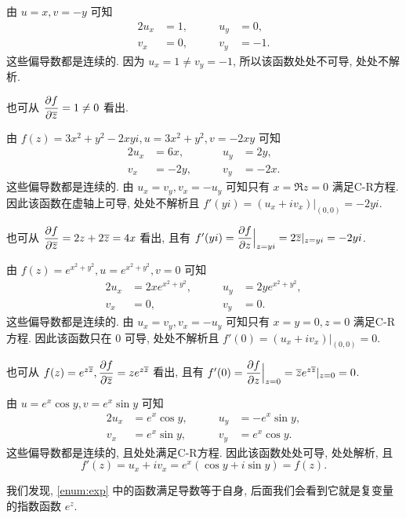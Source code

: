 \begin{solution}\delspace
  \begin{enumnopar}[(i)]
    \item 由 $u=x,v=-y$ 可知
      \begin{alignat*}{2}
        u_x&=1,\qquad&u_y&=0,\\
        v_x&=0,\qquad&v_y&=-1.
      \end{alignat*}
      这些偏导数都是连续的.
      因为 $u_x=1\neq v_y=-1$, 所以该函数处处不可导, 处处不解析.

      也可从 $\dfrac{\partial f}{\partial \overline z}=1\neq0$ 看出.
    \item 由 $f(z)=3x^2+y^2-2xyi,u=3x^2+y^2,v=-2xy$ 可知
      \begin{alignat*}{2}
        u_x&=6x,\qquad&u_y&=2y,\\
        v_x&=-2y, \qquad&v_y&=-2x.
      \end{alignat*}
      这些偏导数都是连续的.
      由 $u_x=v_y,v_x=-u_y$ 可知只有 $x=\Re z=0$ 满足C-R方程.
      因此该函数在虚轴上可导, 处处不解析且 $f'(yi)=(u_x+iv_x)|_{(0,0)}=-2yi$.

      也可从 $\dfrac{\partial f}{\partial \overline z}=2z+2\overline z=4x$ 看出, 且有 $f'(yi)=\dfrac{\partial f}{\partial z}\Big|_{z=yi}=2\overline z|_{z=yi}=-2yi$.
    \item 由 $f(z)=e^{x^2+y^2},u=e^{x^2+y^2},v=0$ 可知
      \begin{alignat*}{2}
        u_x&=2xe^{x^2+y^2},\qquad&u_y&=2ye^{x^2+y^2},\\
        v_x&=0, \qquad&v_y&=0.
      \end{alignat*}
      这些偏导数都是连续的.
      由 $u_x=v_y,v_x=-u_y$ 可知只有 $x=y=0,z=0$ 满足C-R方程.
      因此该函数只在 $0$ 可导, 处处不解析且 $f'(0)=(u_x+iv_x)|_{(0,0)}=0$.

      也可从 $f(z)=e^{z\overline z}, \dfrac{\partial f}{\partial \overline z}=ze^{z\overline z}$ 看出, 且有 $f'(0)=\dfrac{\partial f}{\partial z}\Big|_{z=0}=\overline ze^{z\overline z}|_{z=0}=0$.
    \item 由 $u=e^x\cos y,v=e^x\sin y$ 可知
      \begin{alignat*}{2}
        u_x&=e^x\cos y,\qquad&u_y&=-e^x\sin y,\\
        v_x&=e^x\sin y,\qquad&v_y&=e^x\cos y.
      \end{alignat*}
      这些偏导数都是连续的, 且处处满足C-R方程.
      因此该函数处处可导, 处处解析, 且
      \[f'(z)=u_x+iv_x=e^x(\cos y+i\sin y)=f(z).\]
  \end{enumnopar}
\end{solution}

我们发现, \ref{enum:exp} 中的函数满足导数等于自身, 后面我们会看到它就是复变量的指数函数 $e^z$.

